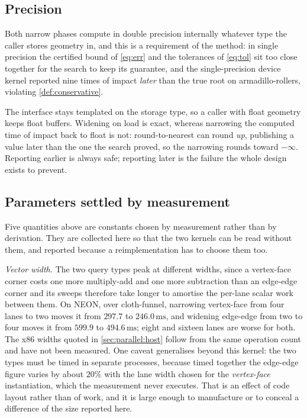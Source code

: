 \subsection{Precision}
\label{sec:parallel:precision}

Both narrow phases compute in double precision internally whatever type the
caller stores geometry in, and this is a requirement of the method: in single
precision the certified bound of \cref{eq:err} and the tolerances of
\cref{eq:tol} sit too close together for the search to keep its guarantee, and
the single-precision device kernel reported nine times of impact \emph{later}
than the true root on armadillo-rollers, violating \cref{def:conservative}.

The interface stays templated on the storage type, so a caller with float
geometry keeps float buffers. Widening on load is exact, whereas narrowing the
computed time of impact back to float is not: round-to-nearest can round
\emph{up}, publishing a value later than the one the search proved, so the
narrowing rounds toward $-\infty$. Reporting earlier is always safe; reporting
later is the failure the whole design exists to prevent.

\subsection{Parameters settled by measurement}
\label{sec:parallel:tuning}

Five quantities above are constants chosen by measurement rather than by
derivation. They are collected here so that the two kernels can be read without
them, and reported because a reimplementation has to choose them too.

\emph{Vector width.} The two query types peak at different widths, since a
vertex-face corner costs one more multiply-add and one more subtraction than an
edge-edge corner and its sweeps therefore take longer to amortise the per-lane
scalar work between them. On NEON, over cloth-funnel, narrowing vertex-face from
four lanes to two moves it from $297.7$ to $246.0\,\mathrm{ms}$, and widening
edge-edge from two to four moves it from $599.9$ to $494.6\,\mathrm{ms}$; eight
and sixteen lanes are worse for both. The x86 widths quoted in
\cref{sec:parallel:host} follow from the same operation count and have not been
measured. One caveat generalises beyond this kernel: the two types must be timed
in separate processes, because timed together the edge-edge figure varies by
about $20\%$ with the lane width chosen for the \emph{vertex-face}
instantiation, which the measurement never executes. That is an effect of code
layout rather than of work, and it is large enough to manufacture or to conceal
a difference of the size reported here.

